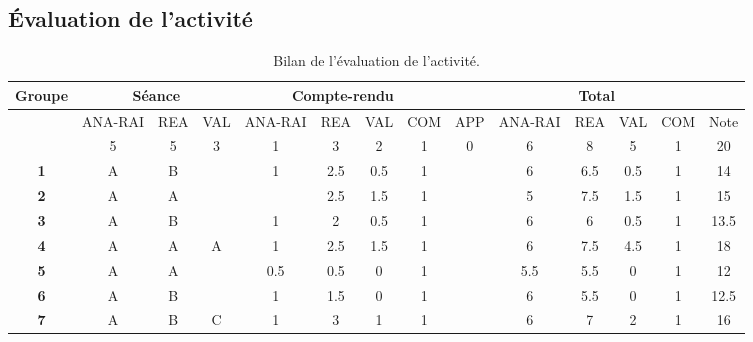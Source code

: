 \documentclass[12pt,a4paper, fleqn]{article}
\newcommand{\app}{\colorbox{bleu_c}{\textcolor{bleu_f}{APP}}}
\newcommand{\rea}{\colorbox{yellow_c}{\textcolor{yellow_f}{REA}}}
\newcommand{\anarai}{\colorbox{green_c}{\textcolor{green_f}{ANA-RAI}}}
\newcommand{\val}{\colorbox{orange_c}{\textcolor{orange_f}{VAL}}}
\newcommand{\com}{\colorbox{red_c}{\textcolor{red_f}{COM}}}
\begin{document}
\begin{landscape}



\section{Évaluation de l'activité}
\label{ann:eval}
\vfill
\begin{table}[h]
\renewcommand\arraystretch{1.5}		%
\begin{center}
\begin{tabular}{|c|c|c|c|c|c|c|c|c|c|c|c|c|c|}
\hline
\textbf{Groupe} & \multicolumn{3}{c|}{\textbf{Séance}} & \multicolumn{4}{c|}{\textbf{Compte-rendu}} & \multicolumn{6}{c|}{\textbf{Total}} \\
\hline 
& \anarai & \rea & \val & \anarai & \rea &\val & \com & \app & \anarai & \rea & \val & \com & Note \\
\hline
& 5 & 5 & 3 & 1 & 3 & 2 & 1 & 0 & 6 & 8 & 5 & 1 & 20 \\
\hline\hline
\textbf{1} & A & B & & 1 & 2.5 & 0.5 & 1 & & 6 & 6.5 & 0.5 & 1 & 14 \\
\hline
\textbf{2} & A & A & & & 2.5 & 1.5 & 1 & & 5 & 7.5 & 1.5 & 1 & 15 \\
\hline
\textbf{3} & A & B & & 1 & 2 & 0.5 & 1 & & 6 & 6 & 0.5 & 1 & 13.5 \\
\hline
\textbf{4} & A & A & A & 1 & 2.5 & 1.5 & 1 & & 6 & 7.5 & 4.5 & 1 & 18 \\
\hline
\textbf{5} & A & A & & 0.5 & 0.5 & 0 & 1 & & 5.5 & 5.5 & 0 & 1 & 12 \\
\hline
\textbf{6} & A & B & & 1 & 1.5 & 0 & 1 & & 6 & 5.5 & 0 & 1 & 12.5  \\
\hline
\textbf{7} & A & B & C & 1 & 3 & 1 & 1 & & 6 & 7 & 2 & 1 & 16 \\
\hline
\end{tabular}
\end{center}
\caption{Bilan de l'évaluation de l'activité.}
\label{tab:eval}
\end{table}
\vfill
\end{landscape}
\end{document}

